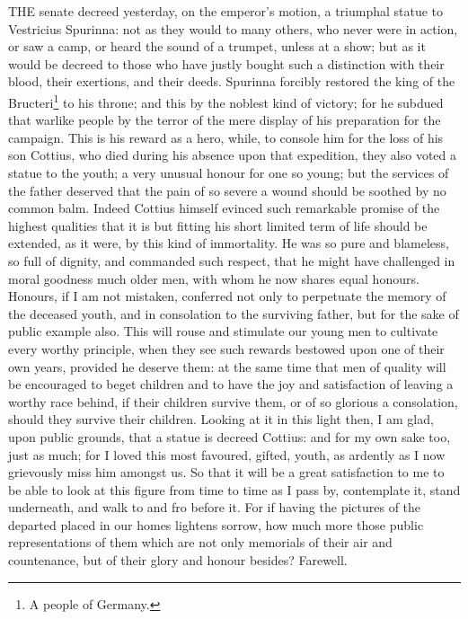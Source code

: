 
THE senate decreed yesterday, on the emperor's motion, a triumphal statue
to Vestricius Spurinna: not as they would to many others, who never were
in action, or saw a camp, or heard the sound of a trumpet, unless at a
show; but as it would be decreed to those who have justly bought such a
distinction with their blood, their exertions, and their deeds. Spurinna
forcibly restored the king of the Bructeri\footnote{A people of Germany.} to his throne; and this
by the noblest kind of victory; for he subdued that warlike people by the
terror of the mere display of his preparation for the campaign. This is
his reward as a hero, while, to console him for the loss of his son
Cottius, who died during his absence upon that expedition, they also voted
a statue to the youth; a very unusual honour for one so young; but the
services of the father deserved that the pain of so severe a wound should
be soothed by no common balm. Indeed Cottius himself evinced such
remarkable promise of the highest qualities that it is but fitting his
short limited term of life should be extended, as it were, by this kind of
immortality. He was so pure and blameless, so full of dignity, and
commanded such respect, that he might have challenged in moral goodness
much older men, with whom he now shares equal honours. Honours, if I am
not mistaken, conferred not only to perpetuate the memory of the deceased
youth, and in consolation to the surviving father, but for the sake of
public example also. This will rouse and stimulate our young men to
cultivate every worthy principle, when they see such rewards bestowed upon
one of their own years, provided he deserve them: at the same time that
men of quality will be encouraged to beget children and to have the joy
and satisfaction of leaving a worthy race behind, if their children
survive them, or of so glorious a consolation, should they survive their
children. Looking at it in this light then, I am glad, upon public
grounds, that a statue is decreed Cottius: and for my own sake too, just
as much; for I loved this most favoured, gifted, youth, as ardently as I
now grievously miss him amongst us. So that it will be a great
satisfaction to me to be able to look at this figure from time to time as
I pass by, contemplate it, stand underneath, and walk to and fro before
it. For if having the pictures of the departed placed in our homes
lightens sorrow, how much more those public representations of them which
are not only memorials of their air and countenance, but of their glory
and honour besides? Farewell.

